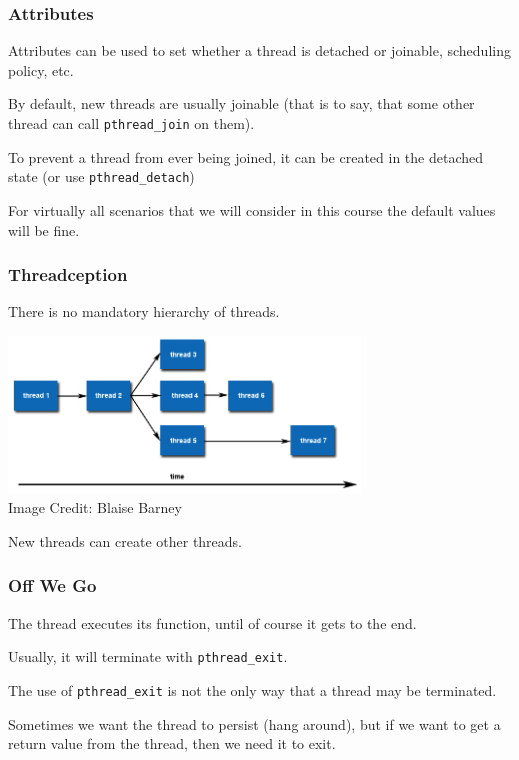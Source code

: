 \begin{frame}
	\frametitle{Attributes}

	Attributes can be used to set whether a thread is detached or joinable, scheduling policy, etc.

	By default, new threads are usually joinable (that is to say, that some other thread can call \texttt{pthread\_join} on them).

	To prevent a thread from ever being joined, it can be created in the detached state (or use \texttt{pthread\_detach})

	For virtually all scenarios that we will consider in this course the default values will be fine.

\end{frame}


\begin{frame}
\frametitle{Threadception}

There is no mandatory hierarchy of threads.

\begin{center}
	\includegraphics[width=0.7\textwidth]{images/peerThreads.png}\\
	\hfill Image Credit: Blaise Barney
\end{center}

New threads can create other threads.

\end{frame}


\begin{frame}
	\frametitle{Off We Go}

	The thread executes its function, until of course it gets to the end.

	Usually, it will terminate with \texttt{pthread\_exit}.

	The use of \texttt{pthread\_exit} is not the only way that a thread may be terminated.

	Sometimes we want the thread to persist (hang around), but if we want to get a return value from the thread, then we need it to exit.

\end{frame}


